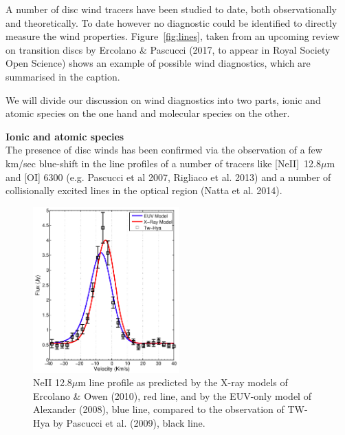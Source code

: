 \documentclass[10pt,fleqn,twoside]{article}
\begin{document}
A number of disc wind tracers have been studied to date, both
observationally and theoretically. To date however no diagnostic could
be identified to directly measure the wind properties. 
Figure~\ref{fig:lines}, taken from an upcoming review on transition discs by
Ercolano \& Pascucci (2017, to appear in Royal Society Open Science)
shows an example of possible wind diagnostics, which are summarised in
the caption.  

We will divide our discussion on wind diagnostics into two parts,
ionic and atomic species on the one hand and molecular species on the
other. 

{\bf Ionic and atomic species}\\

The presence of disc winds has been confirmed via the
observation of a few km/sec blue-shift in the line profiles of a
number of tracers like [NeII]~12.8$\mu$m and [OI] 6300 (e.g. Pascucci
et al 2007, Rigliaco et al. 2013) and a number of collisionally excited lines in the optical
region (Natta et al. 2014). 

 \begin{figure}
   \centering
   \includegraphics[width=0.5\textwidth]{neii.jpg}
   \caption{NeII 12.8$\mu$m line profile as predicted by the X-ray
     models of Ercolano \& Owen (2010), red line, and  by the EUV-only
     model of Alexander (2008), blue line, compared to the observation
     of TW-Hya by Pascucci et al. (2009), black line.
}
              \label{fig:neii}%
    \end{figure}
\end{document}
